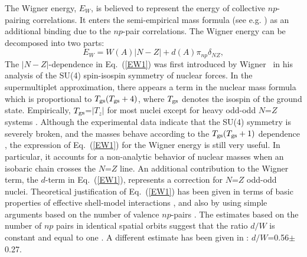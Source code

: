 \documentclass[rmp,aps,floatfix]{revtex4}
\begin{document}
The Wigner energy, 
$E_W$, is believed to 
represent the energy of collective
$np$-pairing correlations. It enters the
semi-empirical mass formula 
(see e.g. \cite{Kra79}) as an  
additional binding due to the 
$np$-pair correlations.
The Wigner energy can be decomposed into two parts:
\begin{equation}\label{EW1}
E_W = W(A)|N-Z| + d(A)\pi_{np}\delta_{NZ},
\end{equation}
The $|N-Z|$-dependence in Eq.~(\ref{EW1})
was first introduced by Wigner~\cite{Wig37} in
his analysis of the SU(4) spin-isospin symmetry of 
nuclear forces. In the supermultiplet approximation, there
appears
a term in the nuclear mass formula which is proportional to
$T_{\rm gs}(T_{\rm gs}+4)$, 
where $T_{\rm gs}$ denotes the isospin
of the ground state.
Empirically, $T_{\rm gs}$=$|T_z|$ for most nuclei except for
heavy odd-odd  $N$=$Z$ systems \cite{Jan65,Zel76}. 
Although the experimental
data indicate that the 
SU(4) symmetry is severely broken, 
and the masses behave according to the  
$T_{\rm gs}(T_{\rm gs}+1)$
dependence \cite{Jan65,Jen84}, 
the expression of Eq.~(\ref{EW1}) for the Wigner energy
is still very useful.
In particular, it accounts for a non-analytic behavior
of nuclear masses when an isobaric chain crosses the $N$=$Z$ 
line. An additional contribution to the Wigner term,
the $d$-term in  Eq.~(\ref{EW1}),
represents a 
correction for $N$=$Z$ odd-odd nuclei.
Theoretical justification of Eq.~(\ref{EW1}) has been given
in terms of basic properties of effective
shell-model interactions \cite{Zel96,Tal62}, and also by
using simple arguments based on the number of valence  
$np$-pairs \cite{Jen84,Mye77}. The estimates based on the 
number of $np$ pairs in identical spatial orbits suggest that
the ratio $d/W$ is constant and equal to one \cite{Mye77}.
A  different estimate has been given in 
 \cite{Jen84}:
$d/W$=0.56$\pm$0.27.
\end{document}

